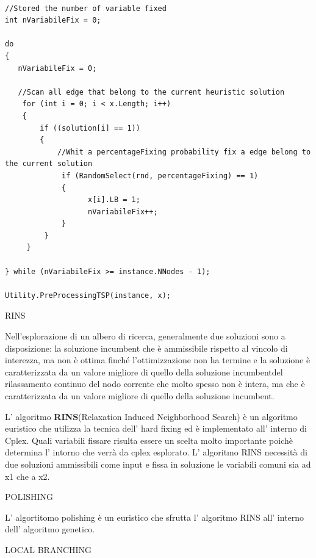 \documentclass[11pt]{article}
\begin{document}
\begin{lstlisting}

//Stored the number of variable fixed
int nVariabileFix = 0;

do
{
   nVariabileFix = 0;

   //Scan all edge that belong to the current heuristic solution
    for (int i = 0; i < x.Length; i++)
    {
        if ((solution[i] == 1))
        {
            //Whit a percentageFixing probability fix a edge belong to the current solution
             if (RandomSelect(rnd, percentageFixing) == 1)
             {
                   x[i].LB = 1;
                   nVariabileFix++;
             }
         }
     }

} while (nVariabileFix >= instance.NNodes - 1);
             
Utility.PreProcessingTSP(instance, x);

\end{lstlisting}


\vspace{2\baselineskip}
RINS
\vspace{2\baselineskip}

Nell’esplorazione di un albero di ricerca, generalmente due soluzioni sono a disposizione: la soluzione incumbent che è ammissibile rispetto al vincolo di interezza, ma non è ottima finché l’ottimizzazione non ha termine e la soluzione è caratterizzata da un valore migliore di quello della soluzione incumbentdel rilassamento continuo del nodo corrente che molto spesso non è intera, ma che è caratterizzata da un valore migliore di quello della soluzione incumbent.

L' algoritmo \textbf{RINS}(Relaxation Induced Neighborhood Search) è un algoritmo euristico che utilizza la tecnica dell' hard fixing ed è implementato all' interno di Cplex. 
Quali variabili fissare risulta essere un scelta molto importante poichè determina l' intorno che verrà da cplex esplorato. L' algoritmo RINS necessità di due soluzioni ammissibili come input e fissa in soluzione le variabili comuni sia ad x1 che a x2. 


\vspace{2\baselineskip}
POLISHING
\vspace{2\baselineskip}

L' algortitomo polishing è un euristico che sfrutta l' algoritmo RINS all' interno dell' algoritmo genetico. 

\vspace{2\baselineskip}
LOCAL BRANCHING
\vspace{2\baselineskip}
\end{document}
